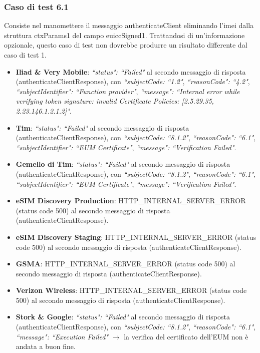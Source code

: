 \documentclass[10pt, oneside]{book}
\begin{document}
\subsubsection{Caso di test 6.1}
Consiste nel manomettere il messaggio authenticateClient eliminando l'imei dalla struttura ctxParams1 del campo euiccSigned1. Trattandosi di un'informazione opzionale, questo caso di test non dovrebbe produrre un risultato differente dal caso di test 1.
\begin{itemize}
\item \textbf{Iliad \& Very Mobile}: \textit{``status": ``Failed"} al secondo messaggio di risposta (authenticateClientResponse), con \textit{``subjectCode: ``1.2"}, \textit{``reasonCode": ``4.2"}, \textit{``subjectIdentifier": ``Function provider"}, \textit{``message": ``Internal error while verifying token signature: invalid Certificate Policies: [2.5.29.35, 2.23.146.1.2.1.2]"}.
\item \textbf{Tim}: \textit{``status": ``Failed"} al secondo messaggio di risposta (authenticateClientResponse), con \textit{``subjectCode: ``8.1.2"}, \textit{``reasonCode": ``6.1"}, \textit{``subjectIdentifier": ``EUM Certificate"}, \textit{``message": ``Verification Failed"}.
\item \textbf{Gemello di Tim}: \textit{``status": ``Failed"} al secondo messaggio di risposta (authenticateClientResponse), con \textit{``subjectCode: ``8.1.2"}, \textit{``reasonCode": ``6.1"}, \textit{``subjectIdentifier": ``EUM Certificate"}, \textit{``message": ``Verification Failed"}.
\item \textbf{eSIM Discovery Production}: HTTP\_INTERNAL\_SERVER\_ERROR (status code 500) al secondo messaggio di risposta (authenticateClientResponse).
\item \textbf{eSIM Discovery Staging}: HTTP\_INTERNAL\_SERVER\_ERROR (status code 500) al secondo messaggio di risposta (authenticateClientResponse).
\item \textbf{GSMA}: HTTP\_INTERNAL\_SERVER\_ERROR (status code 500) al secondo messaggio di risposta (authenticateClientResponse).
\item \textbf{Verizon Wireless}: HTTP\_INTERNAL\_SERVER\_ERROR (status code 500) al secondo messaggio di risposta (authenticateClientResponse).
\item \textbf{Stork \& Google}: \textit{``status": ``Failed"} al secondo messaggio di risposta (authenticateClientResponse), con \textit{``subjectCode: ``8.1.2"}, \textit{``reasonCode": ``6.1"}, \textit{``message": ``Execution Failed"} $\rightarrow$ la verifica del certificato dell'EUM non è andata a buon fine.

\end{itemize}
\end{document}
